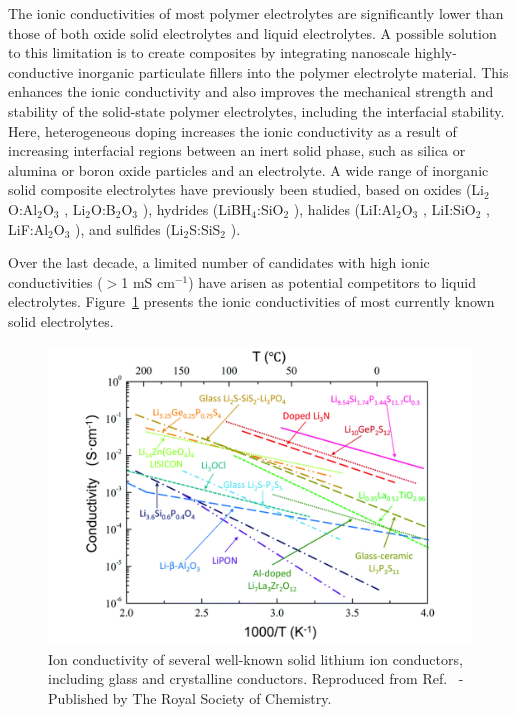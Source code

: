 \documentclass[../main.tex]{subfiles}
\begin{document}
The ionic conductivities of most polymer electrolytes are significantly lower than those of both oxide solid electrolytes and liquid electrolytes. \cite{zhou2016} A possible solution to this limitation is to create composites by integrating nanoscale highly-conductive inorganic particulate fillers into the polymer electrolyte material. \cite{DIRICAN201927} This enhances the ionic conductivity and also improves the mechanical strength and stability of the solid-state polymer electrolytes, including the interfacial stability. \cite{D0SC03121F} Here, heterogeneous doping increases the ionic conductivity as a result of increasing interfacial regions between an inert solid phase, such as silica or alumina or boron oxide particles and an electrolyte. \cite{uvarov2011} A wide range of inorganic solid composite electrolytes have previously been studied, based on oxides (Li$_{2}$O:Al$_{2}$O$_{3}$ \cite{B300908D}, Li$_{2}$O:B$_{2}$O$_{3}$ \cite{Heitjans_2003,Indris2000,Indris2002}), hydrides (LiBH$_{4}$:SiO$_{2}$ \cite{blanchard2015}), halides (LiI:Al$_{2}$O$_{3}$ \cite{liang1973}, LiI:SiO$_{2}$ \cite{phipps1983}, LiF:Al$_{2}$O$_{3}$ \cite{uvarov1992}), and sulfides (Li$_{2}$S:SiS$_{2}$ \cite{pradel1986}). 

Over the last decade, a limited number of candidates with high ionic conductivities ($>$1 mS cm$^{-1}$) have arisen as potential competitors to liquid electrolytes.\cite{kanno_synthesis_2000, murayama_synthesis_2002, murayama_material_2004, minafra_influence_2019,bron_li_2013,whiteley_empowering_2014,huang_superionic_2019,yamane_crystal_2007,homma_crystal_2011} Figure~\ref{fig:conductivity} presents the ionic conductivities of most currently known solid electrolytes.\cite{Zhang2018se_review}

\begin{figure}[htbp]
    \centering
    \includegraphics[scale=0.55]{figures/solid_electrolytes.pdf}
    \caption{Ion conductivity of several well-known solid lithium ion conductors, including glass and crystalline conductors. Reproduced from Ref.~ - Published by The Royal Society of Chemistry.}
    \label{fig:conductivity}
\end{figure}
\end{document}
